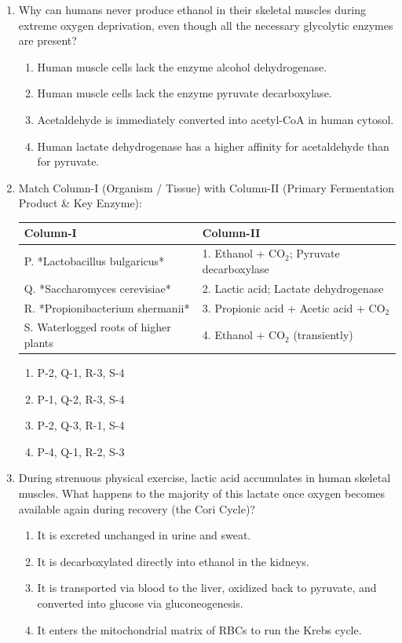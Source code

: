 \documentclass[11pt, a4paper]{article}
\begin{document}
\begin{enumerate}[label=\textbf{\arabic*.}]
\item Why can humans never produce ethanol in their skeletal muscles during extreme oxygen deprivation, even though all the necessary glycolytic enzymes are present?
\begin{enumerate}[label=(\Alph*)]
    \item Human muscle cells lack the enzyme alcohol dehydrogenase.
    \item Human muscle cells lack the enzyme pyruvate decarboxylase.
    \item Acetaldehyde is immediately converted into acetyl-CoA in human cytosol.
    \item Human lactate dehydrogenase has a higher affinity for acetaldehyde than for pyruvate.
\end{enumerate}

\item Match Column-I (Organism / Tissue) with Column-II (Primary Fermentation Product & Key Enzyme):
\begin{center}
\begin{tabular}{|l|l|}
\hline
\textbf{Column-I} & \textbf{Column-II} \\
\hline
P. *Lactobacillus bulgaricus* & 1. Ethanol + $\text{CO}_2$; Pyruvate decarboxylase \\
Q. *Saccharomyces cerevisiae* & 2. Lactic acid; Lactate dehydrogenase \\
R. *Propionibacterium shermanii* & 3. Propionic acid + Acetic acid + $\text{CO}_2$ \\
S. Waterlogged roots of higher plants & 4. Ethanol + $\text{CO}_2$ (transiently) \\
\hline
\end{tabular}
\end{center}
\begin{enumerate}[label=(\Alph*)]
    \item P-2, Q-1, R-3, S-4
    \item P-1, Q-2, R-3, S-4
    \item P-2, Q-3, R-1, S-4
    \item P-4, Q-1, R-2, S-3
\end{enumerate}

\item During strenuous physical exercise, lactic acid accumulates in human skeletal muscles. What happens to the majority of this lactate once oxygen becomes available again during recovery (the Cori Cycle)?
\begin{enumerate}[label=(\Alph*)]
    \item It is excreted unchanged in urine and sweat.
    \item It is decarboxylated directly into ethanol in the kidneys.
    \item It is transported via blood to the liver, oxidized back to pyruvate, and converted into glucose via gluconeogenesis.
    \item It enters the mitochondrial matrix of RBCs to run the Krebs cycle.
\end{enumerate}


\end{enumerate}
\end{document}

